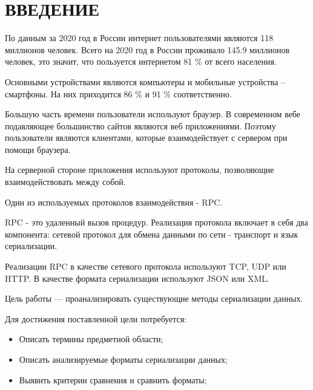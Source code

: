 \chapter*{ВВЕДЕНИЕ}

По данным за 2020 год в России интернет пользователями являются 118 миллионов человек. Всего на 2020 год в России проживало 145.9 миллионов человек, это значит, что пользуется интернетом 81 \% от всего населения.  

Основными устройствами являются компьютеры и мобильные устройства -- смартфоны. На них приходится 86 \% и 91 \% соответственно.

Большую часть времени пользователи используют браузер.
В современном вебе подавляющее большинство сайтов являются веб приложениями. Поэтому пользователи являются клиентами, которые взаимодействует с сервером при помощи браузера.

На серверной стороне приложения используют протоколы, позволяющие взаимодействовать между собой. 

Один из используемых протоколов взаимодействия - RPC.

RPC - это удаленный вызов процедур. Реализация протокола включает в себя два компонента: сетевой протокол для обмена данными по сети - транспорт и язык сериализации.  

Реализации RPC в качестве сетевого протокола используют TCP, UDP или HTTP.  
В качестве формата сериализации используют JSON или XML.

Цель работы --- проанализировать существующие методы сериализации данных.

Для достижения поставленной цели потребуется:
\begin{itemize}
\item Описать термины предметной области;
\item Описать анализируемые форматы сериализации данных;
\item Выявить критерии сравнения и сравнить форматы;
\end{itemize}
